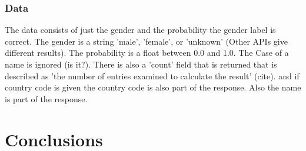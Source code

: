 \documentclass{article}
\begin{document}
\subsubsection{Data}
The data consists of just the gender and the probability the gender label is correct. The gender is a string 'male', 'female', or 'unknown' (Other APIs give different results). The probability is a float between 0.0 and 1.0. The Case of a name is ignored (is it?). There is also a 'count' field that is returned that is described as 'the number of entries examined to calculate the result' (cite). and if country code is given the country code is also part of the response. Also the name is part of the response.



\section{Conclusions}
\end{document}
